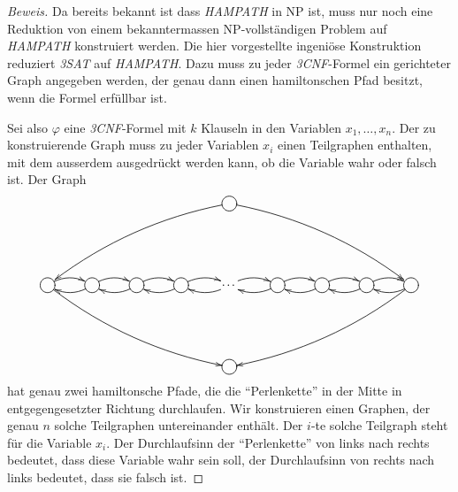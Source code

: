 \begin{proof}[Beweis]
Da bereits bekannt ist dass \textsl{HAMPATH} in NP ist, muss nur
noch eine Reduktion von einem bekanntermassen NP-vollständigen
Problem auf \textsl{HAMPATH} konstruiert werden. Die hier vorgestellte
ingeniöse Konstruktion reduziert \textsl{3SAT} auf \textsl{HAMPATH}.
Dazu muss zu jeder \textsl{3CNF}-Formel ein gerichteter Graph angegeben
werden, der genau dann einen hamiltonschen Pfad besitzt, wenn die
Formel erfüllbar ist.

Sei also $\varphi$ eine \textsl{3CNF}-Formel mit $k$ Klauseln in den Variablen
$x_1,\dots,x_n$. Der zu konstruierende Graph muss zu jeder Variablen
$x_i$ einen Teilgraphen enthalten, mit dem ausserdem ausgedrückt
werden kann, ob die Variable wahr oder falsch ist. Der Graph
\[
\entrymodifiers={++[o][F]}
\xymatrix{
*+\txt{}
	&*+\txt{}
		&*+\txt{}
			&*+\txt{}
				&{} \ar@/_10pt/[ddllll]\ar@/^10pt/[ddrrrr]
					&*+\txt{}
						&*+\txt{}
							&*+\txt{}
								&*+\txt{}
\\
*+\txt{}
\\
{}\ar@/^/[r] \ar@/_10pt/[ddrrrr]
	&{}\ar@/^/[r] \ar@/^/[l]
		&{}\ar@/^/[r] \ar@/^/[l]
			&{}\ar@/^/[r] \ar@/^/[l]
				&*+\txt{\dots}\ar@/^/[r] \ar@/^/[l]
					&{}\ar@/^/[r] \ar@/^/[l]
						&{}\ar@/^/[r] \ar@/^/[l]
							&{}\ar@/^/[r] \ar@/^/[l]
								&{} \ar@/^/[l]\ar@/^10pt/[ddllll]
\\	
*+\txt{}
\\
*+\txt{}
	&*+\txt{}
		&*+\txt{}
			&*+\txt{}
				&{}
					&*+\txt{}
						&*+\txt{}
							&*+\txt{}
								&*+\txt{}
}
\]
hat genau zwei hamiltonsche Pfade, die die ``Perlenkette'' in der
Mitte in entgegengesetzter Richtung durchlaufen.
Wir konstruieren einen Graphen, der
genau $n$ solche Teilgraphen untereinander enthält. Der $i$-te solche
Teilgraph steht für die Variable $x_i$. Der Durchlaufsinn der ``Perlenkette''
von links nach rechts bedeutet, dass diese Variable wahr sein soll,
der Durchlaufsinn von rechts nach links bedeutet, dass sie falsch ist.


\end{proof}

